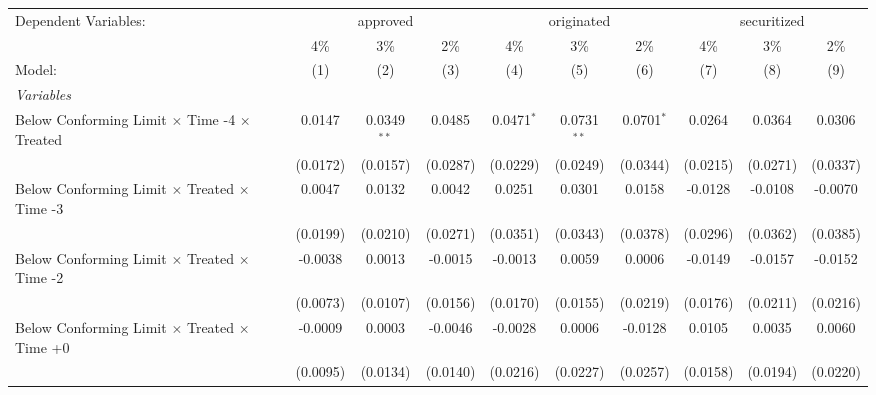 \begingroup
\centering
\begin{tabular}{lccccccccc}
   \tabularnewline \midrule \midrule
   Dependent Variables: & \multicolumn{3}{c}{approved} & \multicolumn{3}{c}{originated} & \multicolumn{3}{c}{securitized}\\
                                                              & 4\%            & 3\%            & 2\%           & 4\%           & 3\%           & 2\%          & 4\%           & 3\%            & 2\% \\    
   Model:                                                     & (1)            & (2)            & (3)           & (4)           & (5)           & (6)          & (7)           & (8)            & (9)\\  
   \midrule
   \emph{Variables}\\
   Below Conforming Limit $\times$ Time -4 $\times$ Treated   & 0.0147         & 0.0349$^{**}$  & 0.0485        & 0.0471$^{*}$  & 0.0731$^{**}$ & 0.0701$^{*}$ & 0.0264        & 0.0364         & 0.0306\\   
                                                              & (0.0172)       & (0.0157)       & (0.0287)      & (0.0229)      & (0.0249)      & (0.0344)     & (0.0215)      & (0.0271)       & (0.0337)\\   
   Below Conforming Limit $\times$ Treated $\times$ Time -3   & 0.0047         & 0.0132         & 0.0042        & 0.0251        & 0.0301        & 0.0158       & -0.0128       & -0.0108        & -0.0070\\   
                                                              & (0.0199)       & (0.0210)       & (0.0271)      & (0.0351)      & (0.0343)      & (0.0378)     & (0.0296)      & (0.0362)       & (0.0385)\\   
   Below Conforming Limit $\times$ Treated $\times$ Time -2   & -0.0038        & 0.0013         & -0.0015       & -0.0013       & 0.0059        & 0.0006       & -0.0149       & -0.0157        & -0.0152\\   
                                                              & (0.0073)       & (0.0107)       & (0.0156)      & (0.0170)      & (0.0155)      & (0.0219)     & (0.0176)      & (0.0211)       & (0.0216)\\   
   Below Conforming Limit $\times$ Treated $\times$ Time +0   & -0.0009        & 0.0003         & -0.0046       & -0.0028       & 0.0006        & -0.0128      & 0.0105        & 0.0035         & 0.0060\\   
                                                              & (0.0095)       & (0.0134)       & (0.0140)      & (0.0216)      & (0.0227)      & (0.0257)     & (0.0158)      & (0.0194)       & (0.0220)\\   

\end{tabular}
